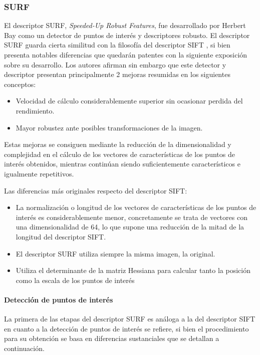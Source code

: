 \subsubsection{SURF}
El descriptor SURF, \textit{Speeded-Up Robust Features}, fue desarrollado por Herbert Bay\cite{Bay} como un detector de puntos de interés y descriptores robusto. El descriptor SURF guarda cierta similitud con la filosofía del descriptor SIFT \cite{Lowe}, si bien presenta notables diferencias que quedarán patentes con la siguiente exposición sobre su desarrollo. Los autores afirman sin embargo que este detector y descriptor presentan principalmente 2 mejoras resumidas en los siguientes conceptos: 
\begin{itemize}
\item Velocidad de cálculo considerablemente superior sin ocasionar perdida del rendimiento.
\item Mayor robustez ante posibles transformaciones de la imagen. 
\end{itemize}
Estas mejoras se consiguen mediante la reducción de la dimensionalidad y complejidad en el cálculo de los vectores de características de los puntos de interés obtenidos, mientras continúan siendo suficientemente característicos e igualmente repetitivos. 

Las diferencias más originales respecto del descriptor SIFT:
\begin{itemize}
\item La normalización o longitud de los vectores de características de los puntos de interés es considerablemente menor, concretamente se trata de vectores con una dimensionalidad de 64, lo que supone una reducción de la mitad de la longitud del descriptor SIFT.
\item El descriptor SURF utiliza siempre la misma imagen, la original. 
\item Utiliza el determinante de la matriz Hessiana para calcular tanto la posición como la escala de los puntos de interés
\end{itemize}

\paragraph{Detección de puntos de interés} 
La primera de las etapas del descriptor SURF es análoga a la del descriptor SIFT en cuanto a la detección de puntos de interés se refiere, si bien el procedimiento para su obtención se basa en diferencias sustanciales que se detallan a continuación. 

